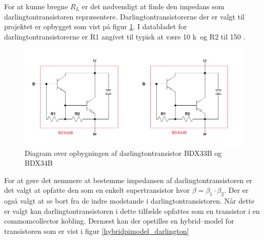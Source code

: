 For at kunne bregne $R_L$ er det nødvendigt at finde den impedans som darlingtontransistoren repræsentere. Darlingtontransistorerne der er valgt til projektet er opbygget som vist på figur \ref{darlington_diagram}. I databladet for darlingtontransistorerne   er R1 angivet til typisk at være 10 k\ohm~og R2 til 150 \ohm.

\begin{figure}[h]
\centering
\includegraphics[width=\textwidth]{teknisk/effektforstaerker/darlingtontransistor_opbygning.png}
\caption{Diagram over opbygningen af darlingtontransistor BDX33B og BDX34B}
\label{darlington_diagram}
\end{figure}

For at gøre det nemmere at bestemme impedansen af darlingtontransistoren er det valgt at opfatte den som en enkelt supertransistor hvor $\beta = \beta_1 \cdot \beta_2$. Der er også valgt at se bort fra de indre modstande i darlingtontransistoren. Når dette er valgt kan darlingtontransistoren i dette tilfælde opfattes som en transistor i en commomcollector kobling. Dernæst kan der opstilles en hybrid--model for transistoren som er vist i figur \ref{hybridpimodel_darlington} 

